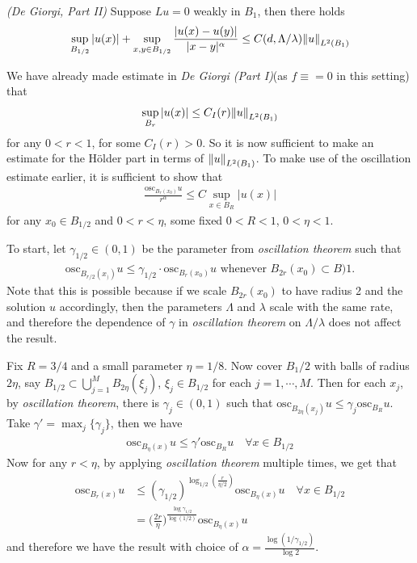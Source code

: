 \documentclass[12pt,a4paper]{article}
\newenvironment{proof}
{\begin{changemargin}{0.5cm}{0.5cm} 
	}%
	{\end{changemargin}
}
\newenvironment{p}
{\begin{proof} 
	}%
	{\end{proof}
}
\begin{document}
 \emph{(De Giorgi, Part II)} Suppose $Lu =0$ weakly in $B_1$, then there holds
\begin{align*}
\sup_{B_{1/2}} |u(x)|+ \sup_{x,y\in B_{1/2}} \frac{|u(x)- u(y)|}{|x-y|^{\alpha}}\leq C(d, \Lambda/\lambda) \snorms{u}{L^2(B_1)}
\end{align*}
\begin{p}
\pf We have already made estimate in \emph{De Giorgi (Part I)}(as $f\equiv =0$ in this setting) that
\begin{align*}
\sup_{B_{r}} |u(x)| \leq C_I(r) \snorms{u}{L^2(B_1)}
\end{align*}
for any $0<r<1$, for some $C_I(r) >0$. So it is now sufficient to make an estimate for the H\"older part in terms of $\snorms{u}{L^2(B_1)}$. To make use of the oscillation estimate earlier, it is sufficient to show that
\begin{align*}
\frac{\text{osc}_{B_r(x_0)} u}{r^{\alpha}} \leq C \sup_{x\in B_R} |u(x)|
\end{align*}
for any $x_0 \in B_{1/2}$ and $0<r< \eta $, some fixed $0<R<1$, $0<\eta <1$.

\quad To start, let $\gamma_{1/2} \in (0,1)$ be the parameter from \emph{oscillation theorem} such that
\begin{align*}
\text{osc}_{B_{r/2}(x_))} u \leq \gamma_{1/2} \cdot \text{osc}_{B_r(x_0)}u\text{ whenever }B_{2r}(x_0) \subset B)1.
\end{align*}
Note that this is possible because if we scale $B_{2r}(x_0)$ to have radius 2 and the solution $u$ accordingly, then the parameters $\Lambda$ and $\lambda$ scale with the same rate, and therefore the dependence of $\gamma$ in \emph{oscillation theorem} on $\Lambda/\lambda$ does not affect the result.

\quad Fix $R=3/4$ and a small parameter $\eta=1/8$.  Now cover $B_1/2$ with balls of radius $2\eta$, say $B_{1/2} \subset \bigcup_{j=1}^M B_{2\eta}(\xi_j)$, $\xi_j \in B_{1/2}$ for each $j=1, \cdots, M$. Then for each $x_j$, by \emph{oscillation theorem}, there is $\gamma_j \in (0,1)$ such that $\text{osc}_{B_{2\eta}(x_j)}u \leq \gamma_j \text{osc}_{B_{R}}u$. Take $\gamma' = \max_j \{\gamma_j\}$, then we have
\begin{align*}
\text{osc}_{B_{\eta}(x)} u \leq \gamma' \text{osc}_{B_R}u \quad \forall x\in B_{1/2}
\end{align*}
Now for any $r < \eta$, by applying \emph{oscillation theorem} multiple times, we get that
\begin{align*}
\text{osc}_{B_{r}(x)} u &\leq (\gamma_{1/2})^{\log_{1/2}(\frac{r}{\eta/2})} \text{osc}_{B_{\eta}(x)}u \quad \forall x\in B_{1/2} \\
&= \big( \frac{2r}{\eta} \big)^{\frac{\log \gamma_{1/2}}{\log(1/2)}} \text{osc}_{B_{\eta}(x)}u \quad
\end{align*}
and therefore we have the result with choice of $\alpha = \frac{\log(1/\gamma_{1/2})}{\log 2}$.

\eop
\end{p}
\end{document}
